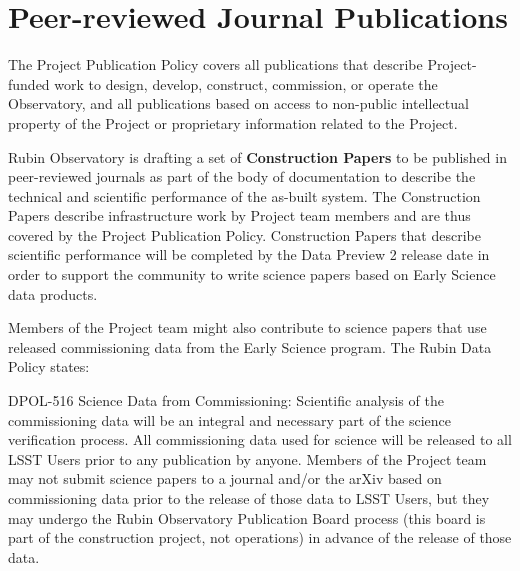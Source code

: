 \documentclass[SE,authoryear,toc,lsstdraft]{lsstdoc}
\begin{document}
\section{Peer-reviewed Journal Publications}
\label{publications}

The Project Publication Policy  covers all publications that describe Project-funded work to design, develop, construct, commission, or operate the Observatory, and all publications based on access to non-public intellectual property of the Project or proprietary information related to the Project.

Rubin Observatory is drafting a set of \textbf{Construction Papers} to be published in peer-reviewed journals as part of the body of documentation to describe the technical and scientific performance of the as-built system.
The Construction Papers describe infrastructure work by Project team members and are thus covered by the Project Publication Policy.
Construction Papers that describe scientific performance will be completed by the Data Preview 2 release date in order to support the community to write science papers based on Early Science data products.

Members of the Project team might also contribute to science papers that use released commissioning data from the Early Science program.
The Rubin Data Policy  states:

\begin{emph}
  {DPOL-516 Science Data from Commissioning: Scientific analysis of the commissioning data will be an integral and necessary part of the science verification process.
  All commissioning data used for science will be released to all LSST Users prior to any publication by anyone.
  Members of the Project team may not submit science papers to a journal and/or the arXiv based on commissioning data prior to the release of those data to LSST Users, but they may undergo the Rubin Observatory Publication Board process (this board is part of the construction project, not operations) in advance of the release of those data.}
\end{emph}


\end{document}
